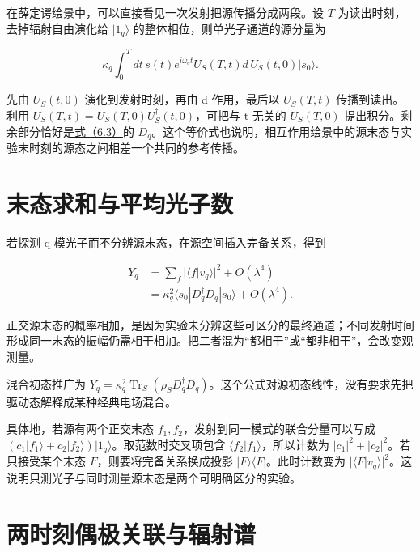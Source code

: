 \documentclass[UTF8,a4paper,zihao=-4,openany,fontset=fandol]{ctexbook}
\begin{document}
在薛定谔绘景中，可以直接看见一次发射把源传播分成两段。设 $T$ 为读出时刻，去掉辐射自由演化给 $|1_q\rangle$ 的整体相位，则单光子通道的源分量为



\begin{equation*}
\kappa_q\int_0^T dt\,s(t)e^{i\omega_qt}
U_S(T,t)d\,U_S(t,0)|s_0\rangle.
\tag{6.3a}\label{eq:6.3a}
\end{equation*}


先由 $U_S(t,0)$ 演化到发射时刻，再由 d 作用，最后以 $U_S(T,t)$ 传播到读出。利用 $U_S(T,t)=U_S(T,0)U_S^\dagger(t,0)$，可把与 t 无关的 $U_S(T,0)$ 提出积分。剩余部分恰好是\hyperref[eq:6.3]{式（6.3）}的 $D_q$。这个等价式也说明，相互作用绘景中的源末态与实验末时刻的源态之间相差一个共同的参考传播。



\section{末态求和与平均光子数}\label{sec:06:6}


若探测 q 模光子而不分辨源末态，在源空间插入完备关系，得到



\begin{equation*}
\begin{aligned}
Y_q&=\sum_f|\langle f|v_q\rangle|^2+O(\lambda^4)\\
&=\kappa_q^2\langle s_0|D_q^\dagger D_q|s_0\rangle
+O(\lambda^4).
\end{aligned}
\tag{6.4}\label{eq:6.4}
\end{equation*}


正交源末态的概率相加，是因为实验未分辨这些可区分的最终通道；不同发射时间形成同一末态的振幅仍需相干相加。把二者混为“都相干”或“都非相干”，会改变观测量。



混合初态推广为 $Y_q=\kappa_q^2\operatorname{Tr}_S(\rho_SD_q^\dagger D_q)$。这个公式对源初态线性，没有要求先把驱动态解释成某种经典电场混合。



具体地，若源有两个正交末态 $f_1,f_2$，发射到同一模式的联合分量可以写成 $(c_1|f_1\rangle+c_2|f_2\rangle)|1_q\rangle$。取范数时交叉项包含 $\langle f_2|f_1\rangle$，所以计数为 $|c_1|^2+|c_2|^2$。若只接受某个末态 $F$，则要将完备关系换成投影 $|F\rangle\langle F|$。此时计数变为 $|\langle F|v_q\rangle|^2$。这说明只测光子与同时测量源末态是两个可明确区分的实验。



\section{两时刻偶极关联与辐射谱}\label{sec:06:7}
\end{document}
